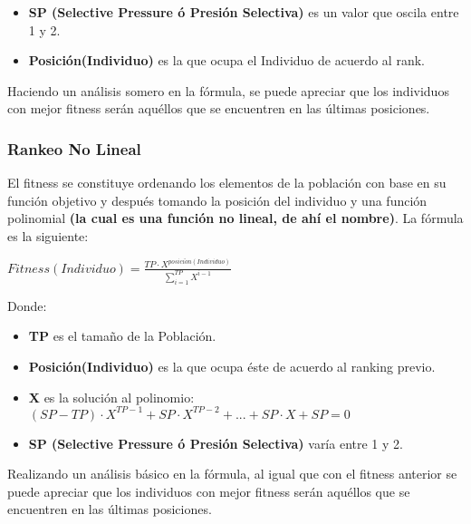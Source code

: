 \documentclass[class=report, crop=false]{standalone}
\begin{document}
\begin{itemize}
\item \textbf{SP (Selective Pressure ó Presión Selectiva)} es un valor que oscila entre 1 y 2.
\item \textbf{Posición(Individuo)} es la que ocupa el Individuo de acuerdo al rank.
\end{itemize}

Haciendo un análisis somero en la fórmula, se puede apreciar 
que los individuos con mejor fitness serán aquéllos que se 
encuentren en las últimas posiciones.

\subsubsection{Rankeo No Lineal}
El fitness se constituye ordenando los elementos de la 
población con base en su función objetivo y después 
tomando la posición del individuo y una función 
polinomial \textbf{(la cual es una función no lineal, de ahí el nombre)}. 
La fórmula es la siguiente:\medskip\break
\centerline{$Fitness(Individuo) = \frac{TP \cdot X^{posici\acute{o}n(Individuo)}}{\sum_{i=1}^{TP}X^{i - 1}}$}\medskip\break
Donde:

\begin{itemize}
\item \textbf{TP} es el tamaño de la Población.
\item \textbf{Posición(Individuo)} es la que ocupa éste de acuerdo al ranking previo.
\item \textbf{X} es la solución al polinomio: \((SP - TP) \cdot X^{TP - 1} + SP \cdot X^{TP - 2} + ... + SP \cdot X + SP = 0\)
\item \textbf{SP (Selective Pressure ó Presión Selectiva)} varía entre 1 y 2.
\end{itemize}

Realizando un análisis básico en la fórmula, al igual que 
con el fitness anterior se puede apreciar que los individuos 
con mejor fitness serán aquéllos que se encuentren en las 
últimas posiciones.

\end{document}
